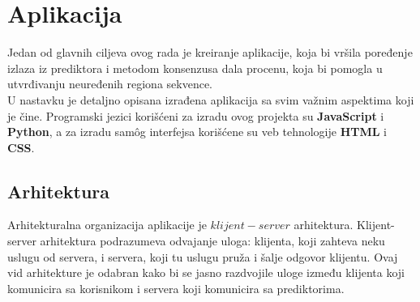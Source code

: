 \chapter{Aplikacija}
Jedan od glavnih ciljeva ovog rada je kreiranje aplikacije, koja bi vršila poređenje izlaza iz prediktora i metodom konsenzusa dala procenu, koja bi pomogla u utvrđivanju neuređenih regiona sekvence.  \\

U nastavku je detaljno opisana izrađena aplikacija sa svim važnim aspektima koji je čine. Programski jezici korišćeni za izradu ovog projekta su \textbf{JavaScript} i \textbf{Python}, a za izradu samôg interfejsa korišćene su veb tehnologije \textbf{HTML} i \textbf{CSS}.
\section{Arhitektura}
Arhitekturalna organizacija aplikacije je $klijent-server$ arhitektura. Klijent-server arhitektura podrazumeva odvajanje uloga: klijenta, koji zahteva neku uslugu od servera, i servera, koji tu uslugu pruža i šalje odgovor klijentu. Ovaj vid arhitekture je odabran kako bi se jasno razdvojile uloge između klijenta koji komunicira sa korisnikom i servera koji komunicira sa prediktorima.

